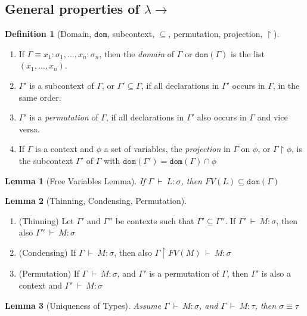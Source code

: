 \documentclass[12pt, a4paper]{article}
\newcommand{\deriv}{\ \vdash\ }
\newtheorem{definition}{Definition}[section]
\newtheorem{lemma}{Lemma}[section]
\begin{document}
\subsection{General properties of \texorpdfstring{$\lambda\to$}{Lg}}
\begin{definition}[Domain, $\mathtt{dom}$, subcontext, $\subseteq$, permutation, projection, $\restriction$]
\end{definition}
\begin{enumerate}
    \item If $\Gamma \equiv x_1 : \sigma_1, \dots, x_n : \sigma_n$, then the \textit{domain} of $\Gamma$ or $\mathtt{dom}(\Gamma)$ is the list $(x_1,\dots,x_n)$.
    \item $\Gamma'$ is a subcontext of $\Gamma$, or $\Gamma' \subseteq \Gamma$, if all declarations in $\Gamma'$ occurs in $\Gamma$, in the same order.
    \item $\Gamma'$ is a \textit{permutation} of $\Gamma$, if all declarations in $\Gamma'$ also occurs in $\Gamma$ and vice versa.
    \item If $\Gamma$ is a context and $\phi$ a set of variables, the \textit{projection} in $\Gamma$ on $\phi$, or $\Gamma \restriction \phi$, is the subcontext $\Gamma'$ of $\Gamma$ with $\mathtt{dom}(\Gamma') = \mathtt{dom}(\Gamma) \cap \phi$
\end{enumerate}

\begin{lemma}[Free Variables Lemma]
    If $\Gamma \deriv L : \sigma$, then $FV(L) \subseteq \mathtt{dom}(\Gamma)$
\end{lemma}

\begin{lemma}[Thinning, Condensing, Permutation]
\end{lemma}
\begin{enumerate}
    \item (Thinning) Let $\Gamma'$ and $\Gamma''$ be contexts such that $\Gamma' \subseteq \Gamma''$. If $\Gamma' \deriv M : \sigma$, then also $\Gamma'' \deriv M : \sigma$
    \item (Condensing) If $\Gamma \deriv M : \sigma$, then also $\Gamma \restriction FV(M) \deriv M : \sigma$
    \item (Permutation) If $\Gamma \deriv M : \sigma$, and $\Gamma'$ is a permutation of $\Gamma$, then $\Gamma'$ is also a context and $\Gamma' \deriv M : \sigma$
\end{enumerate}

\begin{lemma}[Uniqueness of Types]
    Assume $\Gamma \deriv M : \sigma$, and $\Gamma \deriv M : \tau$, then $\sigma \equiv \tau$
\end{lemma}
\end{document}
